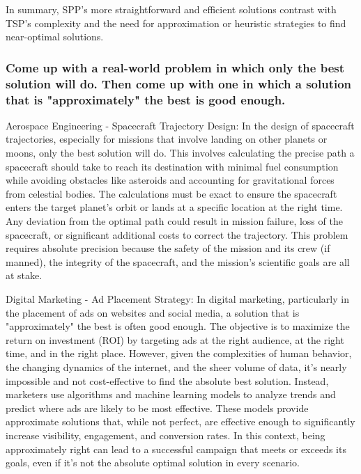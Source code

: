 In summary, SPP's more straightforward and efficient solutions contrast with TSP's complexity and the need for approximation or heuristic strategies to find near-optimal solutions.

\subsubsection{Come up with a real-world problem in which only the best solution will do. Then come up with one in which a solution that is "approximately" the best is good enough.}


Aerospace Engineering - Spacecraft Trajectory Design: In the design of spacecraft trajectories, especially for missions that involve landing on other planets or moons, only the best solution will do. This involves calculating the precise path a spacecraft should take to reach its destination with minimal fuel consumption while avoiding obstacles like asteroids and accounting for gravitational forces from celestial bodies. The calculations must be exact to ensure the spacecraft enters the target planet's orbit or lands at a specific location at the right time. Any deviation from the optimal path could result in mission failure, loss of the spacecraft, or significant additional costs to correct the trajectory. This problem requires absolute precision because the safety of the mission and its crew (if manned), the integrity of the spacecraft, and the mission's scientific goals are all at stake.


Digital Marketing - Ad Placement Strategy: In digital marketing, particularly in the placement of ads on websites and social media, a solution that is "approximately" the best is often good enough. The objective is to maximize the return on investment (ROI) by targeting ads at the right audience, at the right time, and in the right place. However, given the complexities of human behavior, the changing dynamics of the internet, and the sheer volume of data, it's nearly impossible and not cost-effective to find the absolute best solution. Instead, marketers use algorithms and machine learning models to analyze trends and predict where ads are likely to be most effective. These models provide approximate solutions that, while not perfect, are effective enough to significantly increase visibility, engagement, and conversion rates. In this context, being approximately right can lead to a successful campaign that meets or exceeds its goals, even if it's not the absolute optimal solution in every scenario.


